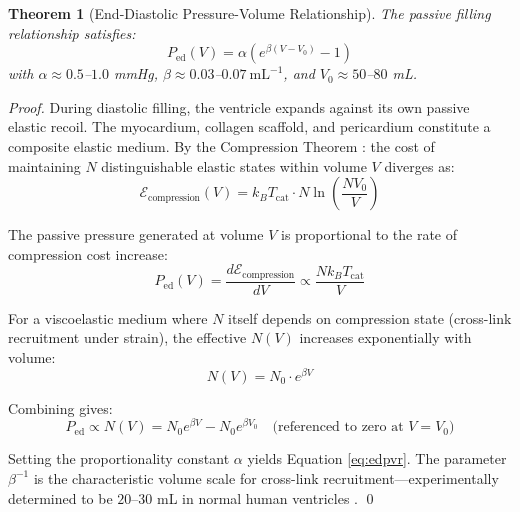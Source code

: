 \documentclass[12pt,a4paper]{article}
\newtheorem{theorem}{Theorem}[section]
\theoremstyle{remark}
\newcommand{\Ped}{P_{\mathrm{ed}}}
\begin{document}
\begin{theorem}[End-Diastolic Pressure-Volume Relationship]
\label{thm:edpvr}
    The passive filling relationship satisfies:
    \begin{equation}
        \boxed{\Ped(V) = \alpha \left(e^{\beta(V - V_0)} - 1\right)}
        \label{eq:edpvr}
    \end{equation}
    with $\alpha \approx 0.5$--$1.0$ mmHg, $\beta \approx 0.03$--$0.07~\mathrm{mL}^{-1}$, and $V_0 \approx 50$--$80$ mL.
\end{theorem}

\begin{proof}
During diastolic filling, the ventricle expands against its own passive elastic recoil. The myocardium, collagen scaffold, and pericardium constitute a composite elastic medium. By the Compression Theorem \cite{sachikonye2024gas}: the cost of maintaining $N$ distinguishable elastic states within volume $V$ diverges as:
\begin{equation}
    \mathcal{E}_{\mathrm{compression}}(V) = k_B T_{\mathrm{cat}} \cdot N \ln\left(\frac{N V_0}{V}\right)
\end{equation}

The passive pressure generated at volume $V$ is proportional to the rate of compression cost increase:
\begin{equation}
    P_{\mathrm{ed}}(V) = \frac{d\mathcal{E}_{\mathrm{compression}}}{dV} \propto \frac{N k_B T_{\mathrm{cat}}}{V}
\end{equation}

For a viscoelastic medium where $N$ itself depends on compression state (cross-link recruitment under strain), the effective $N(V)$ increases exponentially with volume:
\begin{equation}
    N(V) = N_0 \cdot e^{\beta V}
\end{equation}

Combining gives:
\begin{equation}
    P_{\mathrm{ed}} \propto N(V) = N_0 e^{\beta V} - N_0 e^{\beta V_0} \quad\text{(referenced to zero at } V = V_0\text{)}
\end{equation}

Setting the proportionality constant $\alpha$ yields Equation \ref{eq:edpvr}. The parameter $\beta^{-1}$ is the characteristic volume scale for cross-link recruitment—experimentally determined to be $20$--$30$ mL in normal human ventricles \cite{klotz2006single}. \qed
\end{proof}
\end{document}
